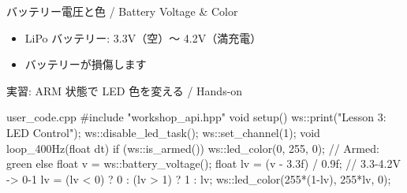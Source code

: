 \begin{frame}{バッテリー電圧と色 / Battery Voltage \& Color}
  \begin{center}
  \end{center}

  \vspace{0.5em}

  \begin{itemize}
    \item LiPo バッテリー: 3.3V（空）〜 4.2V（満充電）
    \item {}バッテリーが損傷します
  \end{itemize}
\end{frame}

\begin{frame}[fragile]{実習: ARM 状態で LED 色を変える / Hands-on}
  \begin{sflisting}[basicstyle=\ttfamily\scriptsize]{user\_code.cpp}
#include "workshop_api.hpp"
void setup() {
    ws::print("Lesson 3: LED Control");
    ws::disable_led_task();
    ws::set_channel(1);
}
void loop_400Hz(float dt) {
    if (ws::is_armed()) {
        ws::led_color(0, 255, 0);  // Armed: green
    } else {
        float v = ws::battery_voltage();
        float lv = (v - 3.3f) / 0.9f; // 3.3-4.2V -> 0-1
        lv = (lv < 0) ? 0 : (lv > 1) ? 1 : lv;
        ws::led_color(255*(1-lv), 255*lv, 0);
    }
}
  \end{sflisting}
\end{frame}

